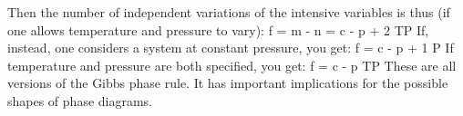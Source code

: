 \documentclass[12pt]{article}
\begin{document}
Then the number of independent variations of the intensive variables is thus (if one allows temperature and pressure to vary): 
\eqs f = m - n = c - p + 2 \text{ (}TP  \eqe
If, instead, one considers a system at constant pressure, you get:
\eqs f = c - p + 1 \text{ (}P  \eqe
If temperature and pressure are both specified, you get:
\eqs f = c - p \text{ (}TP  \eqe
These are all versions of the Gibbs phase rule. It has important implications for the possible shapes of phase diagrams.




\end{document}
